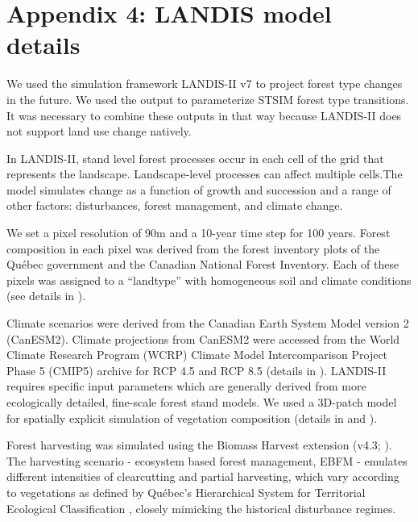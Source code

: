 
\chapter*{\textbf{Appendix 4: LANDIS model details \\ \hspace{1em}}}

\setcounter{chapter}{6}
\setcounter{table}{0}
\setcounter{figure}{0}

We used the simulation framework LANDIS-II v7 \citep{scheller_forest_2004} to project forest type changes in the future. We used the output to parameterize STSIM forest type transitions. It was necessary to combine these outputs in that way because LANDIS-II does not support land use change natively.

In LANDIS-II, stand level forest processes occur in each cell of the grid that represents the landscape. Landscape-level processes can affect multiple cells.The model simulates change as a function of growth and succession and a range of other factors: disturbances, forest management, and climate change. 

We set a pixel resolution of 90m and a 10-year time step for 100 years. Forest composition in each pixel was derived from the forest inventory plots of the Québec government and the Canadian National Forest Inventory. Each of these pixels was assigned to a “landtype” with homogeneous soil and climate conditions (see details in \cite{boulanger_climate_2019}).

Climate scenarios were derived from the Canadian Earth System Model version 2 (CanESM2). Climate projections from CanESM2 were accessed from the World Climate Research Program (WCRP) Climate Model Intercomparison Project Phase 5 (CMIP5) archive for RCP 4.5 and RCP 8.5 (details in \cite{boulanger_climate_2019}).
LANDIS-II requires specific input parameters which are generally derived from more ecologically detailed, fine-scale forest stand models. We used a 3D-patch model for spatially explicit simulation of vegetation composition (details in \cite{lexer_modified_2001} and \cite{tremblay_harvesting_2018}).

Forest harvesting was simulated using the Biomass Harvest extension (v4.3; \cite{gustafson_spatial_2000}). The harvesting scenario - ecosystem based forest management, EBFM - emulates different intensities of clearcutting and partial harvesting, which vary according to vegetations as defined by Québec’s Hierarchical System for Territorial Ecological Classification \citep{bergeron_quebec_1992}, closely mimicking the historical disturbance regimes.